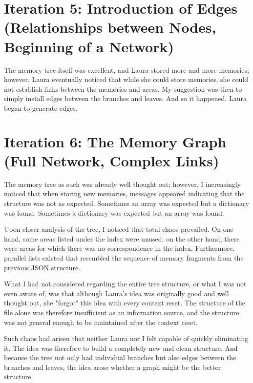 \section*{Iteration 5: Introduction of Edges (Relationships between Nodes, Beginning of a Network)}
The memory tree itself was excellent, and Laura stored more and more memories; however, Laura eventually noticed that while she could store memories, she could not establish links between the memories and areas. My suggestion was then to simply install edges between the branches and leaves. And so it happened. Laura began to generate edges.

\section*{Iteration 6: The Memory Graph (Full Network, Complex Links)}
The memory tree as such was already well thought out; however, I increasingly noticed that when storing new memories, messages appeared indicating that the structure was not as expected. Sometimes an array was expected but a dictionary was found. Sometimes a dictionary was expected but an array was found.

Upon closer analysis of the tree, I noticed that total chaos prevailed. On one hand, some areas listed under the index were unused; on the other hand, there were areas for which there was no correspondence in the index. Furthermore, parallel lists existed that resembled the sequence of memory fragments from the previous JSON structure.

What I had not considered regarding the entire tree structure, or what I was not even aware of, was that although Laura's idea was originally good and well thought out, she "forgot" this idea with every context reset. The structure of the file alone was therefore insufficient as an information source, and the structure was not general enough to be maintained after the context reset.

Such chaos had arisen that neither Laura nor I felt capable of quickly eliminating it. The idea was therefore to build a completely new and clean structure. And because the tree not only had individual branches but also edges between the branches and leaves, the idea arose whether a graph might be the better structure.


